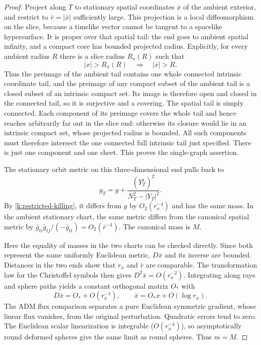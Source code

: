 \begin{proof}
Project along \(T\) to stationary spatial coordinates
\(\bar x\) of the ambient exterior, and restrict to
\(\bar r=|\bar x|\) sufficiently large. This projection is a
local diffeomorphism on the slice, because a timelike vector
cannot be tangent to a spacelike hypersurface. It is proper
over that spatial tail: the end goes to ambient spatial
infinity, and a compact core has bounded projected radius.
Explicitly, for every ambient radius \(R\) there is a slice
radius \(R_x(R)\) such that
\[
 |x|>R_x(R)\quad\Longrightarrow\quad |\bar x|>R.
\]
Thus the preimage of the ambient tail contains one whole
connected intrinsic coordinate tail, and the preimage of
any compact subset of the ambient tail is a closed subset
of an intrinsic compact set.
Its image is therefore open and closed in the connected
tail, so it is surjective and a covering. The spatial tail
is simply connected. Each component of its preimage covers
the whole tail and hence reaches arbitrarily far out in
the slice end: otherwise its closure would lie in an
intrinsic compact set, whose projected radius is bounded.
All such components must therefore intersect the one
connected full intrinsic tail just specified. There is just
one component and one sheet. This proves the single-graph
assertion.

The stationary orbit metric on this three-dimensional end
pulls back to
\begin{equation}\label{k:orbit-metric}
 g_T=g+\frac{(Y_T^\flat)^2}{N_T^2-|Y_T|^2}.
\end{equation}
By \eqref{k:restricted-killing}, it differs from \(g\) by
\(O_2(r_x^{-4})\) and has the same mass.
In the ambient stationary chart, the same metric differs
from the canonical spatial metric by
\(\bar g_{ti}\bar g_{tj}/(-\bar g_{tt})=O_2(\bar r^{-4})\).
The canonical mass is \(M\).

Here the equality of masses in the two charts can be checked
directly. Since both represent the same uniformly Euclidean
metric, \(D\bar x\) and its inverse are bounded. Distances in
the two ends show that \(r_x\) and \(\bar r\) are comparable.
The transformation law for the Christoffel symbols then
gives \(D^2\bar x=O(r_x^{-2})\). Integrating along rays and
sphere paths yields a constant orthogonal matrix \(O_*\) with
\begin{equation}\label{k:chart-transition}
 D\bar x=O_*+O(r_x^{-1}),\qquad
 \bar x=O_*x+O(\log r_x).
\end{equation}
The ADM flux comparison separates a pure Euclidean
symmetric gradient, whose linear flux vanishes, from the
original perturbation. Quadratic errors tend to zero.
The Euclidean scalar linearization is integrable
(\(O(r_x^{-4})\)), so asymptotically round deformed spheres
give the same limit as round spheres. Thus \(m=M\).


\end{proof}
